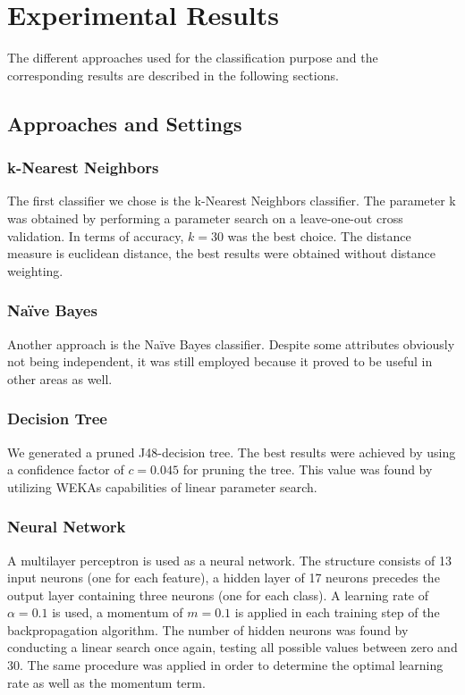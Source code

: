 \section{Experimental Results}
The different approaches used for the classification purpose and the corresponding results are described in the following sections.

\subsection{Approaches and Settings}

\subsubsection*{k-Nearest Neighbors}
The first classifier we chose is the k-Nearest Neighbors classifier. The
parameter k was obtained by performing a parameter search on a
leave-one-out cross validation. In terms of accuracy, \(k=30\) was
the best choice. The distance measure is euclidean distance, the best
results were obtained without distance weighting.

\subsubsection*{Na\"ive Bayes}
Another approach is the Na\"ive Bayes classifier. Despite some
attributes obviously not being independent, it was still employed
because it proved to be useful in other areas as well.

\subsubsection*{Decision Tree}
We generated a pruned J48-decision tree. The best results were
achieved by using a confidence factor of \(c=0.045\) for pruning the
tree. This value was found by utilizing WEKAs capabilities of linear
parameter search.

\subsubsection*{Neural Network}
A multilayer perceptron is used as a neural network. The structure
consists of 13 input neurons (one for each feature), a hidden layer
of 17 neurons precedes the output layer containing three neurons
(one for each class). A learning rate of \(\alpha=0.1\) is used, a momentum of
\(m=0.1\) is applied in each training step of the backpropagation
algorithm. The number of hidden
neurons was found by conducting a linear search once again, testing
all possible values between zero and 30. The same procedure was
applied in order to determine the optimal learning rate as well as the
momentum term.

